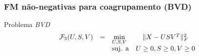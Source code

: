 \documentclass[10pt]{beamer}
\DeclarePairedDelimiter\norm{\lVert}{\rVert}
\begin{document}
\begin{frame}
  \frametitle{FM não-negativas para coagrupamento (BVD)}
  \begin{block}{Problema \textit{BVD}}
    \begin{equation}
        \begin{array}{lclcl}
            \displaystyle \mathcal{F}_3(U, S, V) & = & \displaystyle \min_{U, S, V} & \norm{X - USV^T}^{2}_{F} \\
                                               &   & \text{suj. a}                & U \geq 0, S \geq 0, V \geq 0
        \end{array}   \nonumber
    \end{equation}
  \end{block}

\end{frame}



\end{document}
